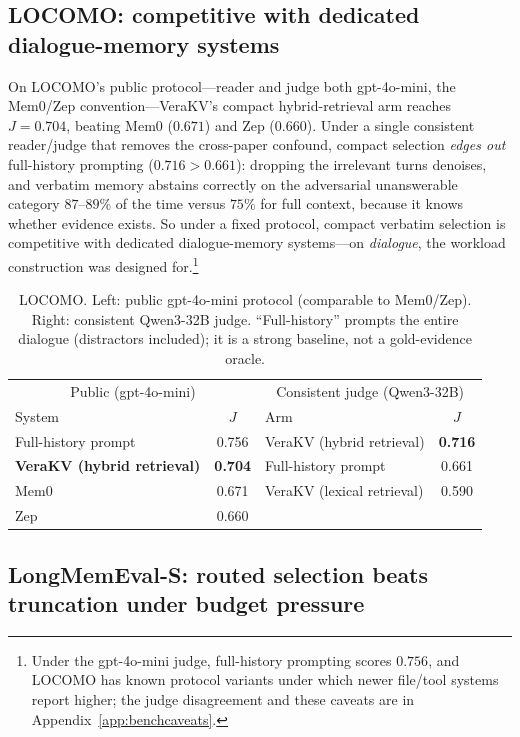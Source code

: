 \documentclass{article} %
\newcommand{\kvm}{VeraKV}
\begin{document}
\subsection{LOCOMO: competitive with dedicated dialogue-memory systems}
\label{sec:locomo}

On LOCOMO's public protocol---reader and judge both gpt-4o-mini, the Mem0/Zep
convention---\kvm{}'s compact hybrid-retrieval arm reaches $J=0.704$, beating
Mem0 ($0.671$) and Zep ($0.660$). Under a single consistent reader/judge that
removes the cross-paper confound, compact selection \emph{edges out} full-history
prompting ($0.716 > 0.661$): dropping the irrelevant turns denoises, and verbatim
memory abstains correctly on the adversarial unanswerable category $87$--$89\%$ of
the time versus $75\%$ for full context, because it knows whether evidence exists.
So under a fixed protocol, compact verbatim selection is competitive with dedicated
dialogue-memory systems---on \emph{dialogue}, the workload construction was designed
for.\footnote{Under the gpt-4o-mini judge, full-history prompting scores $0.756$, and
LOCOMO has known protocol variants under which newer file/tool systems report higher;
the judge disagreement and these caveats are in Appendix~\ref{app:benchcaveats}.}

\begin{table}[t]
\centering
\caption{LOCOMO. Left: public gpt-4o-mini protocol (comparable to Mem0/Zep).
Right: consistent Qwen3-32B judge. ``Full-history'' prompts the entire dialogue
(distractors included); it is a strong baseline, not a gold-evidence oracle.}
\label{tab:locomo}
\small
\begin{tabular}{lc@{\hskip 2.5em}lc}
\toprule
\multicolumn{2}{c}{Public (gpt-4o-mini)} & \multicolumn{2}{c}{Consistent judge (Qwen3-32B)} \\
System & $J$ & Arm & $J$ \\
\midrule
Full-history prompt & 0.756 & \kvm{} (hybrid retrieval) & \textbf{0.716} \\
\textbf{\kvm{} (hybrid retrieval)} & \textbf{0.704} & Full-history prompt & 0.661 \\
Mem0~\citep{mem0} & 0.671 & \kvm{} (lexical retrieval) & 0.590 \\
Zep~\citep{zep} & 0.660 & & \\
\bottomrule
\end{tabular}
\end{table}

\subsection{LongMemEval-S: routed selection beats truncation under budget pressure}
\label{sec:lme}
\end{document}
